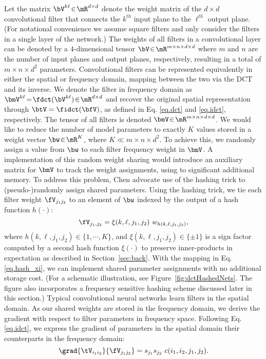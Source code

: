 \documentclass{article} %
\begin{document}
Let the matrix $\bV^{k\ell}\!\in\!\mR^{d\times d}$ denote the weight matrix of the $d\!\times\! d$ convolutional filter that connects the $k^{th}$ input plane to the $\ell^{th}$ output plane.
(For notational convenience we assume square filters and only consider the filters in a single layer of the network.)
The weights of all filters in a convolutional layer can be denoted by a $4$-dimensional tensor $\bV\!\in\!\mR^{m\times n\times d \times d}$ where $m$ and $n$ are the number of input planes and output planes, respectively, resulting in a total of $m\times n\times d^2$ parameters.
Convolutional filters can be represented equivalently in either the spatial or frequency domain, mapping between the two via the DCT and its inverse.
We denote the filter in frequency domain as $\bmV^{k\ell} \!=\! \fdct(\bV^{k\ell})\!\in\!\mR^{d\times d}$ and recover the original spatial representation through $\btV = \fidct(\bfV)$, as defined in Eq. \eqref{eq.dct} and \eqref{eq.idct}, respectively.
The tensor of all filters is denoted $\bmV\!\in\!\mR^{m\times n\times d \times d}$.
We would like to reduce the number of model parameters to exactly $K$ values stored in a weight vector $\bw \!\in\!\mR^{K}$, where $K \ll m\times n\times d^2$.
To achieve this, we randomly assign a value from $\bw$ to each filter frequency weight in $\bmV$.
A \naive{} implementation of this random weight sharing would introduce an auxiliary matrix for $\bmV$ to track the weight assignments, using to significant additional memory.
To address this problem, Chen \etal{}\cite{chen2015compressing} advocate use of the hashing trick to (pseudo-)randomly assign shared parameters.
Using the hashing trick, we tie each filter weight $\fV_{j_1 j_2}$ to an element of $\bw$ indexed by the output of a hash function $h(\cdot)$:
\begin{equation}
	\fV_{j_1,j_2} = \xi(k, \ell, j_1,j_2)\ w_{h(k, \ell, j_1,j_2 )},
	\label{eq.hash_xi}
\end{equation}
where $h(k, \ell, j_1,j_2)\!\in\!\{1,\cdots,K\}$, and $\xi(k, \ell, j_1,j_2)\!\in\!\{\pm 1\}$ is a sign factor computed by a second hash function $\xi(\cdot)$ to preserve inner-products in expectation as described in Section~\ref{sec:back}.
With the mapping in Eq. \eqref{eq.hash_xi}, we can implement shared parameter assignments with no additional storage cost. (For a schematic illustration, see Figure~\ref{fig:dctHashedNets}. The figure also incorporates a frequency sensitive hashing scheme discussed later in this section.)
Typical convolutional neural networks learn filters in the spatial domain. As our shared weights are stored in the frequency domain, we derive the gradient with respect to filter parameters in frequency space.
Following Eq. \eqref{eq.idct}, we express the gradient of parameters in the spatial domain \wrt{} their counterparts in the frequency domain:
\begin{equation}
	\grad{\tV_{i_1 i_2}}{\fV_{j_1 j_2}} = s_{j_1} s_{j_2}\ c(i_1,i_2,j_1,j_2).
	\label{eq.grad_w_w}
\end{equation}
\end{document}
